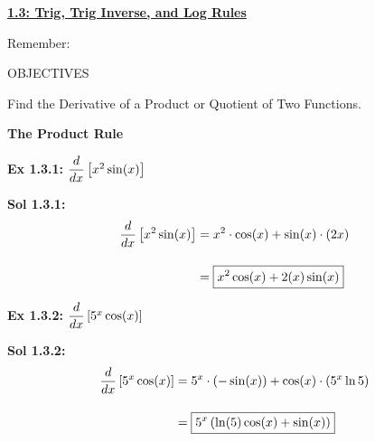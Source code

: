 \textbf{\underline{\large{1.3: Trig, Trig Inverse, and Log Rules}}} \par

Remember:
\begin{center}
\end{center}

\begin{tcolorbox}[objective]
    \begin{center}
        OBJECTIVES \\[11pt]
    \end{center}
    Find the Derivative of a Product or Quotient of Two Functions. 
\end{tcolorbox}

\bigskip

\hypertarget{Product Rule}{\textbf{\large{The Product Rule}}} \par

\begin{tcolorbox}[example]
    \textbf{Ex 1.3.1: } $\dfrac{d}{dx} \left[x^2\sin (x)\right]$ 
\end{tcolorbox}
\begin{tcolorbox}[solution]
    \textbf{Sol 1.3.1: } \begin{align*}
        \dfrac{d}{dx} \left[x^2\sin (x)\right] & = x^2 \cdot \cos (x) + \sin (x) \cdot (2x) \\[11pt]
        & = \boxed{x^2\cos (x) + 2(x)\sin (x)}
    \end{align*} 
\end{tcolorbox} \vspace{11pt}

\begin{tcolorbox}[example]
    \textbf{Ex 1.3.2: } $\dfrac{d}{dx} \left[5^x \cos (x)\right]$
\end{tcolorbox}
\begin{tcolorbox}[solution]
    \textbf{Sol 1.3.2: } \begin{align*}
        \dfrac{d}{dx} \left[5^x \cos (x)\right] & = 5^x \cdot (-\sin (x)) + \cos (x) \cdot (5^x \ln 5) \\[11pt]
        & = \boxed{5^x \left(\ln (5)\cos (x) + \sin(x)\right)}
    \end{align*}
\end{tcolorbox}

